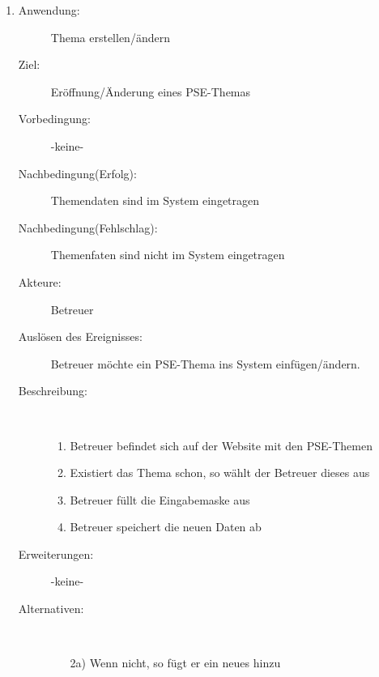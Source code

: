\documentclass[parskip=full]{scrartcl}
\newcommand{\swtLabel}[1]{\textbf{\textbackslash #1\arabic*0\textbackslash}}
\begin{document}
\begin{enumerate} [label=\swtLabel{B}]
  
  \item
	\begin{description}
  		\item[Anwendung:] Thema erstellen/ändern
  		\item[Ziel:] Eröffnung/Änderung eines PSE-Themas
  		\item[Vorbedingung:] -keine-
  		\item[Nachbedingung(Erfolg):] Themendaten sind im System eingetragen
  		\item[Nachbedingung(Fehlschlag):] Themenfaten sind nicht im System
  		eingetragen
  		\item[Akteure:] Betreuer
  		\item[Auslösen des Ereignisses:] Betreuer möchte ein PSE-Thema ins System
  		einfügen/ändern.
  		\item[Beschreibung:]~
  	\begin{enumerate}
  	  \item Betreuer befindet sich auf der Website mit den PSE-Themen
  	  \item Existiert das Thema schon, so wählt der Betreuer dieses aus
  	  \item Betreuer füllt die Eingabemaske aus
  	  \item Betreuer speichert die neuen Daten ab
  	\end{enumerate}
  	\item[Erweiterungen:] -keine-
  	\item[Alternativen:]~
  	\begin{enumerate}
  	  \item[2a)] Wenn nicht, so fügt er ein neues hinzu
  	\end{enumerate}  
  \end{description}


\end{enumerate}
\end{document}
